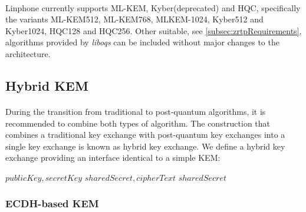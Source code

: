 \documentclass[a4paper,11pt]{article}
\begin{document}
\paragraph{}Linphone currently supports ML-KEM, Kyber(deprecated) and HQC, specifically the variants ML-KEM512, ML-KEM768, MLKEM-1024, Kyber512 and Kyber1024, HQC128 and HQC256. Other suitable, see \ref{subsec:zrtpRequirements}, algorithms provided by \textit{liboqs} can be included without major changes to the architecture.

\subsection{Hybrid KEM}
\paragraph{}During the transition from traditional to post-quantum algorithms, it is recommended to combine both types of algorithm. The construction that combines a traditional key
   exchange with post-quantum key exchanges into a single key exchange is known as hybrid key exchange. We define a hybrid key exchange providing an interface identical to a simple KEM:
  \begin{algorithm}
  \begin{algorithmic}
    \State \Return $publicKey,secretKey$
  \EndFunction
  \Statex
    \State \Return $sharedSecret,cipherText$
  \EndFunction
  \Statex
    \State \Return $sharedSecret$
  \EndFunction
  \end{algorithmic}
  \caption{KEM interface}
  \end{algorithm}
  \FloatBarrier

\subsubsection{ECDH-based KEM}
\end{document}
